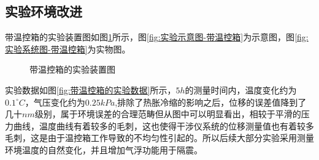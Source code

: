 \subsection{实验环境改进}
\label{section:实验环境改进}
带温控箱的实验装置图如图\ref{fig:带温控箱的实验装置图}所示，图\ref{fig:实验示意图-带温控箱}为示意图，图\ref{fig:实验系统图-带温控箱}为实物图。
\begin{figure}[htb]
    \centering
    \caption{带温控箱的实验装置图}
    \label{fig:带温控箱的实验装置图}
  \end{figure}
实验数据如图\ref{fig:带温控箱的实验数据}所示，$5h$的测量时间内，温度变化约为$0.1^\circ C$，气压变化约为$0.25kPa$,排除了热胀冷缩的影响之后，位移的误差值降到了几十$nm$级别，属于环境误差的合理范畴但从图中可以明显看出，相较于平滑的压力曲线，温度曲线有着较多的毛刺，这也使得干涉仪系统的位移测量值也有着较多毛刺，这是由于温控箱工作导致的不均匀性引起的。所以后续大部分实验采用测量环境温度的自然变化，并且增加气浮功能用于隔震。
